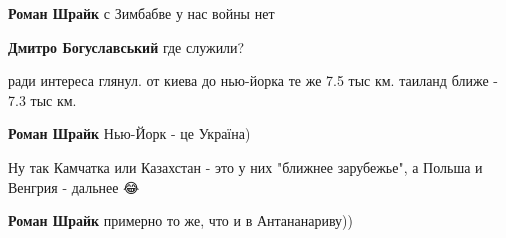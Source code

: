\begin{itemize}
\begin{itemize}
\textbf{Роман Шрайк} с Зимбабве у нас войны нет

\begin{itemize}
 
\textbf{Дмитро Богуславський} где служили?
\end{itemize}

 

ради интереса глянул. от киева до нью-йорка те же 7.5 тыс км. таиланд ближе -
7.3 тыс км.

\begin{itemize}
 
\textbf{Роман Шрайк} Нью-Йорк - це Україна)
\end{itemize}

 
Ну так Камчатка или Казахстан - это у них "ближнее зарубежье", а Польша и Венгрия - дальнее 😂

 
\textbf{Роман Шрайк} примерно то же, что и в Антананариву))

 

\end{itemize}
\end{itemize}
